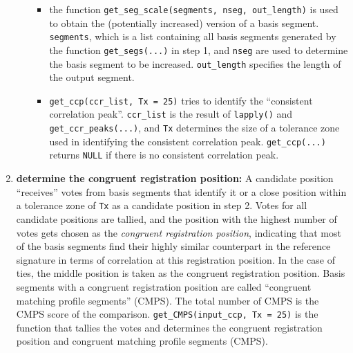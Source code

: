 \begin{enumerate}
\begin{itemize}
    \begin{itemize}
    \tightlist
    \item
      the function
      \texttt{get\_seg\_scale(segments,\ nseg,\ out\_length)} is used to
      obtain the (potentially increased) version of a basis segment.
      \texttt{segments}, which is a list containing all basis segments
      generated by the function \texttt{get\_segs(...)} in step 1, and
      \texttt{nseg} are used to determine the basis segment to be
      increased. \texttt{out\_length} specifies the length of the output
      segment.
    \item
      \texttt{get\_ccp(ccr\_list,\ Tx\ =\ 25)} tries to identify the
      ``consistent correlation peak''. \texttt{ccr\_list} is the result
      of \texttt{lapply()} and \texttt{get\_ccr\_peaks(...)}, and
      \texttt{Tx} determines the size of a tolerance zone used in
      identifying the consistent correlation peak.
      \texttt{get\_ccp(...)} returns \texttt{NULL} if there is no
      consistent correlation peak.
    \end{itemize}
  \end{itemize}
\item
  \textbf{determine the congruent registration position:} A candidate
  position ``receives'' votes from basis segments that identify it or a
  close position within a tolerance zone of \texttt{Tx} as a candidate
  position in step 2. Votes for all candidate positions are tallied, and
  the position with the highest number of votes gets chosen as the
  \emph{congruent registration position}, indicating that most of the
  basis segments find their highly similar counterpart in the reference
  signature in terms of correlation at this registration position. In
  the case of ties, the middle position is taken as the congruent
  registration position. Basis segments with a congruent registration
  position are called ``congruent matching profile segments'' (CMPS).
  The total number of CMPS is the CMPS score of the comparison.
  \texttt{get\_CMPS(input\_ccp,\ Tx\ =\ 25)} is the function that
  tallies the votes and determines the congruent registration position
  and congruent matching profile segments (CMPS).
\end{enumerate}

